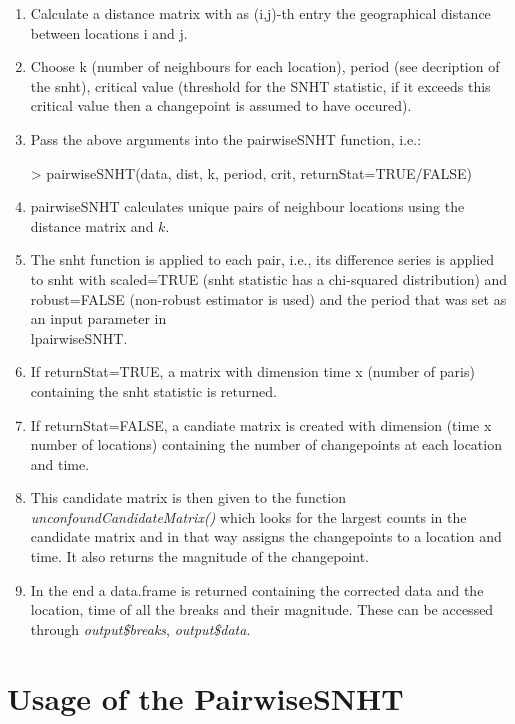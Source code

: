 \documentclass[nojss]{jss}
\begin{document}
\begin{enumerate}
\item Calculate a distance matrix with as (i,j)-th entry the geographical distance between locations i and j.
\item Choose k (number of neighbours for each location), period (see decription of the snht), critical value (threshold for the SNHT statistic, if it exceeds this critical value then a changepoint is assumed to have occured).
\item Pass the above arguments into the pairwiseSNHT function, i.e.:
\begin{Schunk}
\begin{Sinput}
> pairwiseSNHT(data, dist, k, period, crit, returnStat=TRUE/FALSE)
\end{Sinput}
\end{Schunk}
\item pairwiseSNHT calculates unique pairs of neighbour locations using the distance matrix and $k$.
\item The snht function is applied to each pair, i.e., its difference series is applied to snht with scaled=TRUE (snht statistic has a chi-squared distribution) and robust=FALSE (non-robust estimator is used) and the period that was set as an input parameter in\\
lpairwiseSNHT.
\item If returnStat=TRUE, a matrix with dimension time x (number of paris) containing the snht statistic is returned.
\item If returnStat=FALSE, a candiate matrix is created with dimension (time x number of locations) containing the number of changepoints at each location and time.
\item This candidate matrix is then given to the function \textit{unconfoundCandidateMatrix()} which looks for the largest counts in the candidate matrix and in that way assigns the changepoints to a location and time. It also returns the magnitude of the changepoint.
\item In the end a data.frame is returned containing the corrected data and the location, time of all the breaks and their magnitude. These can be accessed through \textit{output\$breaks}, \textit{output\$data}.
\end{enumerate}

\section{Usage of the PairwiseSNHT}
\end{document}
